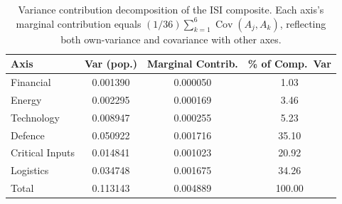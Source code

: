 \begin{table}[htbp]
\centering
\caption{Variance contribution decomposition of the ISI composite.  Each axis's
marginal contribution equals $(1/36)\sum_{k=1}^{6}\operatorname{Cov}(A_j, A_k)$,
reflecting both own-variance and covariance with other axes.}
\label{tab:variance-decomp}
\small
\setlength{\tabcolsep}{4pt}
\begin{tabular*}{\textwidth}{@{\extracolsep{\fill}}
  l
  S[table-format=1.6,round-precision=6]
  S[table-format=1.6,round-precision=6]
  S[table-format=3.2,round-precision=2]
  @{}}
\toprule
{\textbf{Axis}} & {\textbf{Var (pop.)}} & {\textbf{Marginal Contrib.}} & {\textbf{\% of Comp.\ Var}} \\
\midrule
  Financial       & 0.001390 & 0.000050 &  1.03 \\
  Energy          & 0.002295 & 0.000169 &  3.46 \\
  Technology      & 0.008947 & 0.000255 &  5.23 \\
  Defence         & 0.050922 & 0.001716 & 35.10 \\
  Critical Inputs & 0.014841 & 0.001023 & 20.92 \\
  Logistics       & 0.034748 & 0.001675 & 34.26 \\
\midrule
  Total           & 0.113143 & 0.004889 & 100.00 \\
\bottomrule
\end{tabular*}
\end{table}
